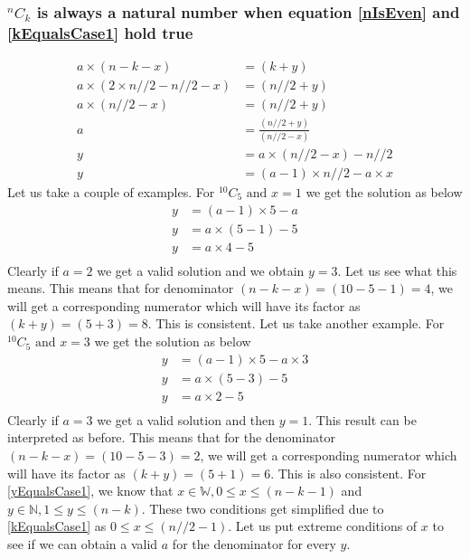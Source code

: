 \documentclass[10pt, twoside]{article}
\newcommand*{\Combination}[2]{{}^{#1}C_{#2}}%
\begin{document}
\subsubsection{$\Combination{n}{k}$ is always a natural number when equation \eqref{nIsEven} and \eqref{kEqualsCase1} hold true}\label{ProofkEqualsCase1}
\begin{align}
	a \times (n-k-x) &= (k+y) \nonumber \\
	a \times (2\times n//2 - n//2 -x) &= (n//2+y) \nonumber \\
	a \times(n//2 -x) &= (n//2 + y) \nonumber \\
	a &= \frac{(n//2+y)}{(n//2-x)} \nonumber\\
	y &= a\times(n//2-x) - n//2 \nonumber \\
	y &= (a-1)\times n//2 - a\times x \label{yEqualsCase1}
\end{align}
Let us take a couple of examples. \newline
For $\Combination{10}{5} \text{ and } x = 1$ we get the solution as below
\begin{align*}
	y &= (a-1)\times 5 - a \\
	y &= a \times (5 - 1) - 5 \\
	y &= a \times 4 - 5 \\
\end{align*}
Clearly if $a = 2$ we get a valid solution and we obtain $y=3$. Let us see what this means. This means that for denominator $(n-k-x) = (10-5-1) = 4$, we will get a corresponding numerator which will have its factor as $(k+y) = (5+3) = 8$. This is consistent. Let us take another example.\newline
For $\Combination{10}{5} \text{ and } x = 3$ we get the solution as below
\begin{align*}
	y &= (a-1)\times 5 - a \times 3 \\
	y &= a \times (5 - 3) - 5 \\
	y &= a \times 2 - 5 \\
\end{align*}
Clearly if $a = 3$ we get a valid solution and then $y=1$. This result can be interpreted as before. This means that for the denominator $(n-k-x) = (10-5-3) = 2$, we will get a corresponding numerator which will have its factor as $(k+y) = (5+1) = 6$. This is also consistent.\newline
For \eqref{yEqualsCase1}, we know that $x \in \mathbb{W}, 0 \leq x \leq (n-k-1)$ and $y \in \mathbb{N}, 1 \leq y \leq (n-k)$. These two conditions get simplified due to \eqref{kEqualsCase1} as $0 \leq x \leq (n//2-1)$. Let us put extreme conditions of $x$ to see if we can obtain a valid \textbf{$a$} for the denominator for every $y$.
\end{document}
